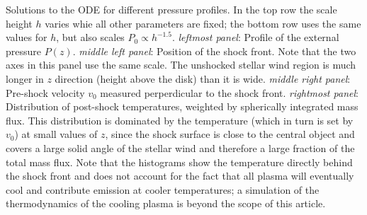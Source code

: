 \label{fig:p_ext}
Solutions to the ODE for different pressure profiles. In the top row the scale height $h$ varies whie all other parameters are fixed; the bottom row uses the same values for $h$, but also scales $P_0\propto h^{-1.5}$.
\emph{leftmost panel}: Profile of the external pressure $P(z)$. 
\emph{middle left panel}: Position of the shock front. Note that the two axes in this panel use the same scale. The unshocked stellar wind region is much longer in $z$ direction (height above the disk) than it is wide. 
\emph{middle right panel}: Pre-shock velocity $v_0$ measured perperdicular to the shock front. 
\emph{rightmost panel}: Distribution of post-shock temperatures, weighted by spherically integrated mass flux. This distribution is dominated by the temperature (which in turn is set by $v_0$) at small values of $z$, since the shock surface is close to the central object and covers a large solid angle of the stellar wind and therefore a large fraction of the total mass flux. Note that the histograms show the temperature directly behind the shock front and does not account for the fact that all plasma will eventually cool and contribute emission at cooler temperatures; a simulation of the thermodynamics of the cooling plasma is beyond the scope of this article.